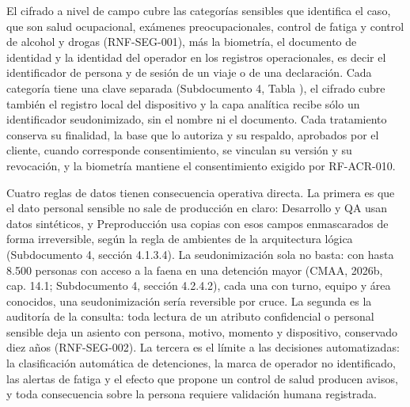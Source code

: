 \documentclass[subdoc]{../../comun/overfore}
\begin{document}
El cifrado a nivel de campo cubre las categorías sensibles que identifica el caso, que son salud ocupacional, exámenes preocupacionales, control de fatiga y control de alcohol y drogas (RNF-SEG-001), más la biometría, el documento de identidad y la identidad del operador en los registros operacionales, es decir el identificador de persona y de sesión de un viaje o de una declaración. Cada categoría tiene una clave separada (Subdocumento 4, Tabla ), el cifrado cubre también el registro local del dispositivo y la capa analítica recibe sólo un identificador seudonimizado, sin el nombre ni el documento. Cada tratamiento conserva su finalidad, la base que lo autoriza y su respaldo, aprobados por el cliente, cuando corresponde consentimiento, se vinculan su versión y su revocación, y la biometría mantiene el consentimiento exigido por RF-ACR-010.

Cuatro reglas de datos tienen consecuencia operativa directa. La primera es que el dato personal sensible no sale de producción en claro: Desarrollo y QA usan datos sintéticos, y Preproducción usa copias con esos campos enmascarados de forma irreversible, según la regla de ambientes de la arquitectura lógica (Subdocumento 4, sección 4.1.3.4). La seudonimización sola no basta: con hasta 8.500 personas con acceso a la faena en una detención mayor (CMAA, 2026b, cap. 14.1; Subdocumento 4, sección 4.2.4.2), cada una con turno, equipo y área conocidos, una seudonimización sería reversible por cruce. La segunda es la auditoría de la consulta: toda lectura de un atributo confidencial o personal sensible deja un asiento con persona, motivo, momento y dispositivo, conservado diez años (RNF-SEG-002). La tercera es el límite a las decisiones automatizadas: la clasificación automática de detenciones, la marca de operador no identificado, las alertas de fatiga y el efecto que propone un control de salud producen avisos, y toda consecuencia sobre la persona requiere validación humana registrada.
\end{document}
